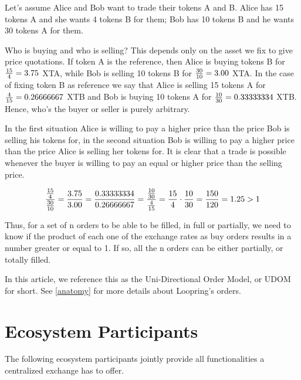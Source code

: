\documentclass[UTF8,nofonts]{article}
\begin{document}
Let's assume Alice and Bob want to trade their tokens A and B. Alice has 15 tokens A and she wants 4 tokens B for them; Bob has 10 tokens B  and he wants 30 tokens A for them.

Who is buying and who is selling? This depends only on the asset we fix to give price quotations. If token A is the reference, then Alice is buying tokens B for ${15 \over 4} = 3.75$ XTA, while Bob is selling 10 tokens B for ${30 \over 10} = 3.00$ XTA. In the case of fixing token B as reference we say that Alice is selling 15 tokens A for ${4\over 15}=0.26666667$ XTB and Bob is buying 10 tokens A for ${10 \over 30}=0.33333334$ XTB. Hence, who's the buyer or seller is purely arbitrary.

In the first situation Alice is willing to pay a higher price than the price Bob is selling his tokens for, in the second situation Bob is willing to pay a higher price than the price Alice is selling her tokens for. It is clear that a trade is possible whenever the buyer is willing to pay an equal or higher price than the selling price.

\begin{equation}
{{15\over 4} \over {30\over 10}} = {3.75 \over 3.00}	= {0.33333334 \over 0.26666667} = {{10 \over 30} \over {4 \over 15}} = {15 \over 4} \cdot {10 \over 30} = {150 \over 120} = 1.25 > 1
\end{equation}

Thus, for a set of n orders to be able to be filled, in full or partially, we need to know if the product of each one of the exchange rates as buy orders results in a number greater or equal to 1. If so, all the n orders can be either partially, or totally filled.

In this article, we reference this as the Uni-Directional Order Model, or UDOM for short. See \ref{anatomy} for more details about Loopring's orders.


\section{Ecosystem Participants}
The following ecosystem participants jointly provide all functionalities a centralized exchange has to offer. 
\end{document}
